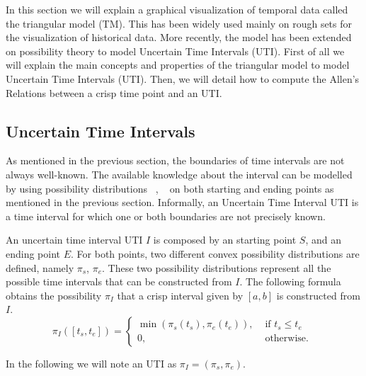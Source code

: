 In this section we will explain a graphical visualization of temporal data called the triangular model (TM). This has been widely used mainly on rough sets for the visualization of historical data. More recently, the model has been extended on possibility theory to model Uncertain Time Intervals (UTI).
First of all we will explain the main concepts and properties of the triangular model to model Uncertain Time Intervals (UTI). Then, we will detail how to compute the Allen's Relations between a crisp time point and an UTI.


\subsection{\label{subsec:utis}Uncertain Time Intervals}
As mentioned in the previous section, the boundaries of time intervals are not always well-known. The available knowledge about the interval can be modelled by using possibility distributions ~\cite{Billiet2012}, ~\cite{JoseEnriquePons2012} on both starting and ending points as mentioned in the previous section. Informally, an Uncertain Time Interval UTI is a time interval for which one or both boundaries are not precisely known. 

\begin{definition}
 \label{def:uncertain-time-interval}
An uncertain time interval UTI $I$ is composed by an starting point $S$, and an ending point $E$. For both points, two different convex possibility distributions are defined, namely $\pi_s$, $\pi_e$. These two possibility distributions represent all the possible time intervals that can be constructed from $I$. The following formula obtains the possibility $\pi_{I}$ that a crisp interval  given by  $[a, b]$ is constructed from $I$. 
\begin{equation}
 \label{eq:possibility-uti}
\pi_{I} \left(\left[t_s, t_e\right] \right) = 
\begin{cases}
 \min \left(\pi_s (t_s), \pi_e (t_e) \right), & \mbox{ if } t_s \leq t_e\\
0, & \mbox{ otherwise. }
\end{cases}
\end{equation}

In the following we will note an UTI as $\pi_{I} = \left(\pi_s, \pi_e \right)$.

\end{definition}




